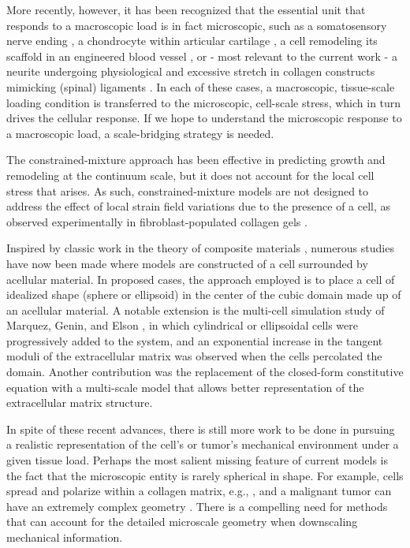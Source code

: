 \documentclass[]{interact}
\begin{document}
More recently, however, it has been recognized that the essential unit that responds to a macroscopic load is in fact microscopic, such as a somatosensory nerve ending \citep{Quindlen:2016ik}, a chondrocyte within articular cartilage \citep{Guilak:2000ir}, a cell remodeling its scaffold in an engineered blood vessel \citep{Isenberg:2006cg,Syedain:2017br}, or - most relevant to the current work - a neurite undergoing physiological and excessive stretch in collagen constructs mimicking (spinal) ligaments \citep{Sperry:2017ez,Zhang:2017gr}. In each of these cases, a macroscopic, tissue-scale loading condition is transferred to the microscopic, cell-scale stress, which in turn drives the cellular response. If we hope to understand the microscopic response to a macroscopic load, a scale-bridging strategy is needed.

The constrained-mixture approach \citep{Humphrey:2002ga} has been effective in predicting growth and remodeling at the continuum scale, but it does not account for the local cell stress that arises. As such, constrained-mixture models are not designed to address the effect of local strain field variations due to the presence of a cell, as observed experimentally in fibroblast-populated collagen gels \citep{Pizzo:2005hv}. 

Inspired by classic work in the theory of composite materials \citep{Hashin:1962tm}, numerous studies have now been made where models are constructed of a cell surrounded by acellular material. In proposed cases, the approach employed is to place a cell of idealized shape (sphere or ellipsoid) in the center of the cubic domain made up of an acellular material. A notable extension is the multi-cell simulation study of Marquez, Genin, and Elson \citep{Marquez:2010dm}, in which cylindrical or ellipsoidal cells were progressively added to the system, and an exponential increase in the tangent moduli of the extracellular matrix was observed when the cells percolated the domain.  Another contribution \citep{Lai:2013fp} was the replacement of the closed-form constitutive equation with a multi-scale model that allows better representation of the extracellular matrix structure.

In spite of these recent advances, there is still more work to be done in pursuing a realistic representation of the cell's or tumor's mechanical environment under a given tissue load. Perhaps the most salient missing feature of current models is the fact that the microscopic entity is rarely spherical in shape.  For example, cells spread and polarize within a collagen matrix, e.g., \citep{Guido:1993cm,Friedl:1998dl}, and a malignant tumor can have an extremely complex geometry \citep{Cristini:2003ja}. There is a compelling need for methods that can account for the detailed microscale geometry when downscaling mechanical information.
\end{document}
